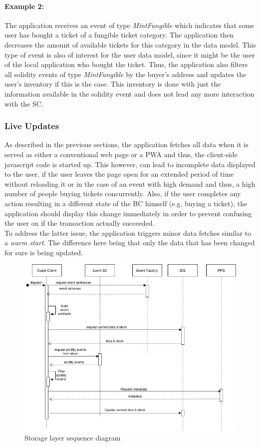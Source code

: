 \paragraph{Example 2:} The application receives an event of type \textit{MintFungible} which indicates that some user has bought a ticket of a fungible ticket category. The application then decreases the amount of available tickets for this category in the data model. This type of event is also of interest for the user data model, since it might be the user of the local application who bought the ticket. Thus, the application also filters all solidity events of type \textit{MintFungible} by the buyer's address and updates the user's inventory if this is the case. This inventory is done with just the information available in the solidity event and does not lead any more interaction with the SC.

\subsubsection{Live Updates}

As described in the previous sections, the application fetches all data when it is served as either a conventional web page or a PWA and thus, the client-side javascript code is started up. This however, can lead to incomplete data displayed to the user, if the user leaves the page open for an extended period of time without reloading it or in the case of an event with high demand and thus, a high number of people buying tickets concurrently. Also, if the user completes any action resulting in a different state of the BC himself (e.g. buying a ticket), the application should display this change immediately in order to prevent confusing the user on if the transaction actually succeeded. 
\\
To address the latter issue, the application triggers minor data fetches similar to a \textit{warm start}. The difference here being that only the data that has been changed for sure is being updated.

\begin{figure}[H]
    \centering
    \includegraphics[width=14cm]{images/storage_sequence.png}
    \caption{Storage layer sequence diagram}
    \label{fig:storage_sequence}
\end{figure}

